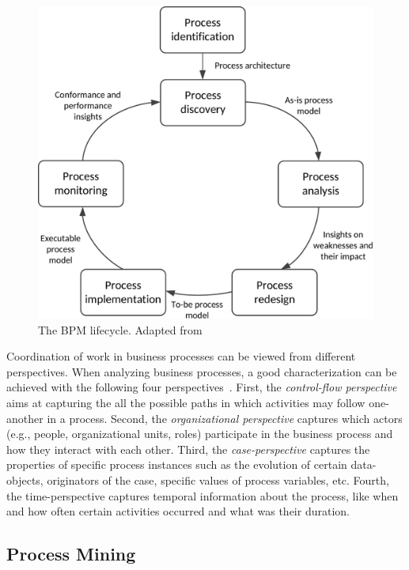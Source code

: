 \begin{figure}
	\centering
	\includegraphics[width=0.8\linewidth]{figures/bpm-lifecycle}
	\caption[The BPM lifecycle]{The BPM lifecycle. Adapted from \cite[]{Dumas2018}}
	\label{fig:bpm-lifecycle}
\end{figure}

Coordination of work in business processes can be viewed from different perspectives. When analyzing business processes, a good characterization can be achieved with the following four perspectives~\citep{DBLP:books/sp/Aalst16}. 
First, the \emph{control-flow perspective} aims at capturing the all the possible paths in which activities may follow one-another in a process. Second, the \emph{organizational perspective} captures which actors (e.g., people, organizational units, roles) participate in the business process and how they interact with each other. Third, the \emph{case-perspective} captures the properties of specific process instances such as the evolution of certain data-objects, originators of the case, specific values of process variables, etc. Fourth, the time-perspective captures temporal information about the process, like when and how often certain activities occurred and what was their duration.


\subsection{Process Mining}
\label{sec:process-mining}


